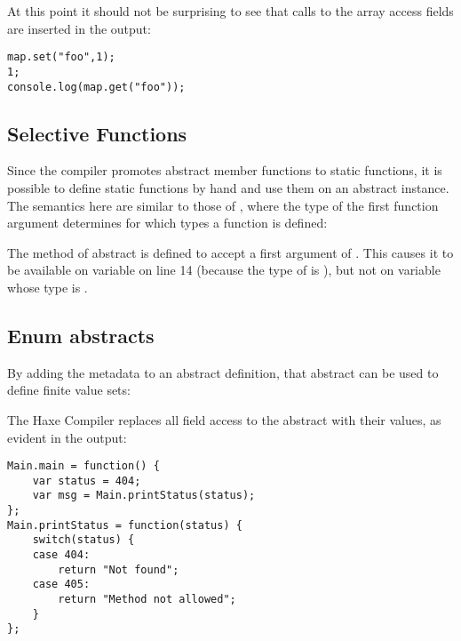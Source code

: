 
At this point it should not be surprising to see that calls to the array access fields are inserted in the output:

\begin{lstlisting}
map.set("foo",1);
1;
console.log(map.get("foo"));
\end{lstlisting}


\subsection{Selective Functions}
\label{types-abstract-selective-functions}

Since the compiler promotes abstract member functions to static functions, it is possible to define static functions by hand and use them on an abstract instance. The semantics here are similar to those of , where the type of the first function argument determines for which types a function is defined:

The method  of abstract  is defined to accept a first argument of . This causes it to be available on variable  on line 14 (because the type of  is ), but not on variable  whose type is .



\subsection{Enum abstracts}
\label{types-abstract-enum}

By adding the  metadata to an abstract definition, that abstract can be used to define finite value sets:


The Haxe Compiler replaces all field access to the  abstract with their values, as evident in the  output:

\begin{lstlisting}
Main.main = function() {
	var status = 404;
	var msg = Main.printStatus(status);
};
Main.printStatus = function(status) {
	switch(status) {
	case 404:
		return "Not found";
	case 405:
		return "Method not allowed";
	}
};
\end{lstlisting}


